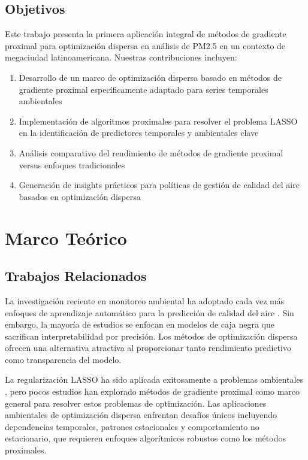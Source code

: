 \documentclass[conference]{IEEEtran}
\begin{document}
\subsection{Objetivos}

Este trabajo presenta la primera aplicación integral de métodos de gradiente proximal para optimización dispersa en análisis de PM2.5 en un contexto de megaciudad latinoamericana. Nuestras contribuciones incluyen:

\begin{enumerate}
    \item Desarrollo de un marco de optimización dispersa basado en métodos de gradiente proximal específicamente adaptado para series temporales ambientales
    \item Implementación de algoritmos proximales para resolver el problema LASSO en la identificación de predictores temporales y ambientales clave
    \item Análisis comparativo del rendimiento de métodos de gradiente proximal versus enfoques tradicionales
    \item Generación de insights prácticos para políticas de gestión de calidad del aire basados en optimización dispersa
\end{enumerate}

\section{Marco Teórico}

\subsection{Trabajos Relacionados}

La investigación reciente en monitoreo ambiental ha adoptado cada vez más enfoques de aprendizaje automático para la predicción de calidad del aire \cite{houdou2024, xiao2020}. Sin embargo, la mayoría de estudios se enfocan en modelos de caja negra que sacrifican interpretabilidad por precisión. Los métodos de optimización dispersa ofrecen una alternativa atractiva al proporcionar tanto rendimiento predictivo como transparencia del modelo.

La regularización LASSO ha sido aplicada exitosamente a problemas ambientales \cite{pak2025, liu2021}, pero pocos estudios han explorado métodos de gradiente proximal como marco general para resolver estos problemas de optimización. Las aplicaciones ambientales de optimización dispersa enfrentan desafíos únicos incluyendo dependencias temporales, patrones estacionales y comportamiento no estacionario, que requieren enfoques algorítmicos robustos como los métodos proximales.
\end{document}

